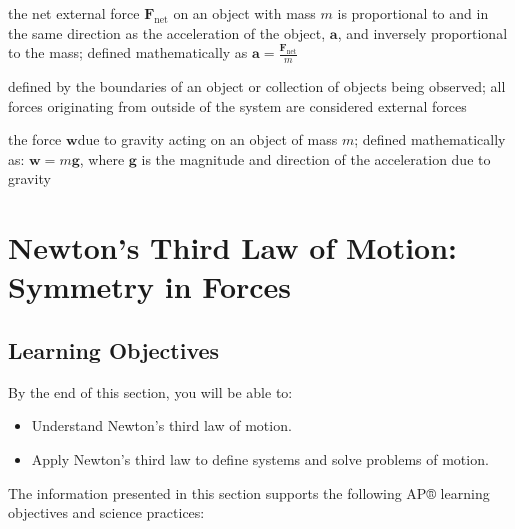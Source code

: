 \documentclass[
]{book}
\providecommand{\tightlist}{%
  \setlength{\itemsep}{0pt}\setlength{\parskip}{0pt}}
\begin{document}
\begin{description}
\tightlist
\item[Newton's second law of motion]
the net external force \(\textbf{F}_{\text{net}}{}\) on an object with
mass \(m{}\) is proportional to and in the same direction as the
acceleration of the object, \(\textbf{a}{}\), and inversely
proportional to the mass; defined mathematically as
\(\textbf{a} = \frac{\textbf{F}_{\text{net}}}{m}\)
\end{description}

\begin{description}
\tightlist
\item[system]
defined by the boundaries of an object or collection of objects
being observed; all forces originating from outside of the system
are considered external forces
\end{description}

\begin{description}
\tightlist
\item[weight]
the force \(\textbf{w}{}\)due to gravity acting on an object of mass
\(m{}\); defined mathematically as: \emph{\({\textbf{w} = m\textbf{g}}{}\)},
where \(\textbf{g}{}\) is the magnitude and direction of the
acceleration due to gravity
\end{description}

\hypertarget{newtons-third-law-of-motion-symmetry-in-forces}{%
\section{Newton's Third Law of Motion: Symmetry in Forces}\label{newtons-third-law-of-motion-symmetry-in-forces}}

\hypertarget{fs-id2242736}{}
\hypertarget{learning-objectives-15}{%
\subsection{Learning Objectives}\label{learning-objectives-15}}

By the end of this section, you will be able to:

\begin{itemize}
\tightlist
\item
  Understand Newton's third law of motion.
\item
  Apply Newton's third law to define systems and solve problems of
  motion.
\end{itemize}

The information presented in this section supports the following AP®
learning objectives and science practices:
\end{document}
